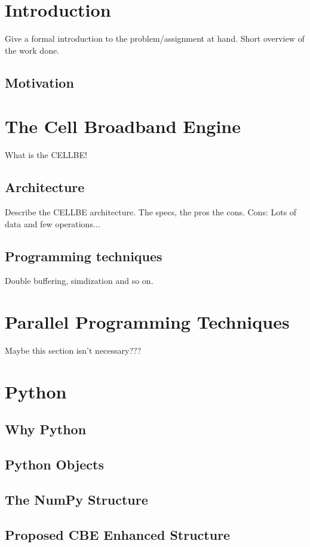 \documentclass[10pt,a4paper,onesided]{article}
\begin{document}
\renewcommand{\thepage}{\roman{page}}
\renewcommand{\thepage}{\arabic{page}}
\setcounter{page}{1}

\section{Introduction}
Give a formal introduction to the problem/assignment at hand. Short
overview of the work done.
\subsection{Motivation}


\section{The Cell Broadband Engine}
What is the CELLBE!
\subsection{Architecture}
Describe the CELLBE architecture. The specs, the pros the cons.
Cons: Lots of data and few operations...
\subsection{Programming techniques}
Double buffering, simdization and so on.

\section{Parallel Programming Techniques}
Maybe this section isn't necessary???

\section{Python}
\subsection{Why Python}
\subsection{Python Objects}
\subsection{The NumPy Structure}
\subsection{Proposed CBE Enhanced Structure}
\end{document}
